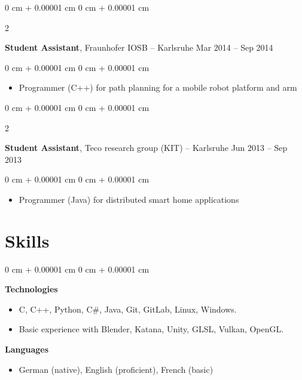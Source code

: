 \documentclass[10pt, letterpaper]{article}
\newenvironment{highlights}{
    \begin{itemize}[
        topsep=0.10 cm,
        parsep=0.10 cm,
        partopsep=0pt,
        itemsep=0pt,
        leftmargin=0 cm + 10pt
    ]
}{
    \end{itemize}
} %
\newenvironment{onecolentry}{
    \begin{adjustwidth}{
        0 cm + 0.00001 cm
    }{
        0 cm + 0.00001 cm
    }
}{
    \end{adjustwidth}
} %
\newenvironment{twocolentry}[2][]{
    \onecolentry
    \def\secondColumn{#2}
    \setcolumnwidth{\fill, 4.5 cm}
    \begin{paracol}{2}
}{
    \switchcolumn \raggedleft \secondColumn
    \end{paracol}
    \endonecolentry
} %
\begin{document}
        \expspace

        \begin{twocolentry}{
            Mar 2014 – Sep 2014
        }
            \textbf{Student Assistant}, Fraunhofer IOSB -- Karlsruhe\end{twocolentry}

        \vspace{0.10 cm}
        \begin{onecolentry}
            \begin{highlights}
                \item Programmer (C++) for path planning for a mobile robot platform and arm
            \end{highlights}
        \end{onecolentry}
        \expspace

        \begin{twocolentry}{
            Jun 2013 – Sep 2013
        }
            \textbf{Student Assistant}, Teco research group (KIT) -- Karlsruhe\end{twocolentry}

        \vspace{0.10 cm}
        \begin{onecolentry}
            \begin{highlights}
                \item Programmer (Java) for distributed smart home applications
            \end{highlights}
        \end{onecolentry}



    \sectionspace
    \section{Skills}
    \sectspacetop
    \begin{onecolentry}
    \textbf{Technologies}
            \begin{highlights}
                \item C, C++, Python, C\#, Java, Git, GitLab, Linux, Windows.
                \item Basic experience with Blender, Katana, Unity, GLSL, Vulkan, OpenGL.
                \end{highlights}
                \expspace
                \textbf{Languages}
                \begin{highlights}
                \item German (native), English (proficient), French (basic)
            \end{highlights}
        \end{onecolentry}
    
\end{document}
